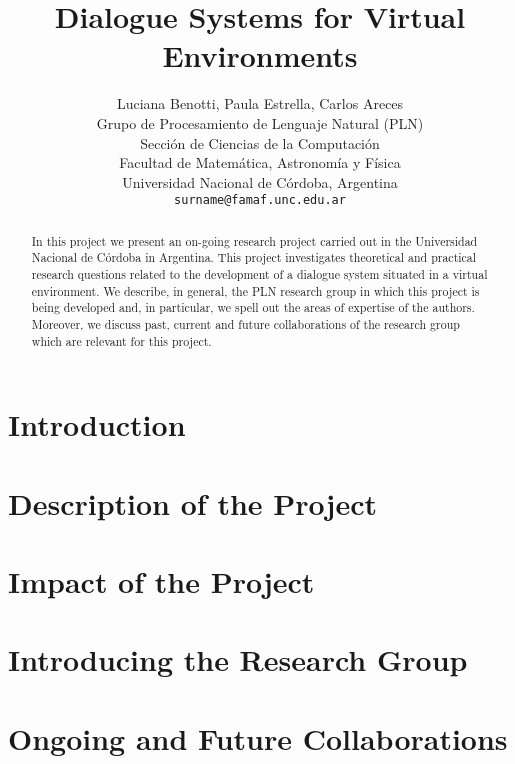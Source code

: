 \documentclass[11pt,letterpaper]{article}
\title{Dialogue Systems for Virtual Environments}
\author{Luciana Benotti, Paula Estrella, Carlos Areces \\
 Grupo de Procesamiento de Lenguaje Natural (PLN) \\
Secci\'on de Ciencias de la Computaci\'on \\
Facultad de Matem\'atica, Astronom\'ia y F\'isica \\
Universidad Nacional de C\'ordoba, Argentina \\
  {\tt surname@famaf.unc.edu.ar}
}
\date{}
\begin{document}
\maketitle
\begin{abstract}
In this project we present an on-going research project carried out in the Universidad Nacional de C\'ordoba in Argentina. This project investigates theoretical and practical research questions related to the development of a dialogue system situated in a virtual environment. We describe, in general, the PLN research group in which this project is being developed and, in particular, we spell out the areas of expertise of the authors. Moreover, we discuss past, current and future collaborations of the research group which are relevant for this project.
\end{abstract}

\section{Introduction}\label{intro}


\section{Description of the Project}\label{description}


\section{Impact of the Project}\label{impact}


\section{Introducing the Research Group}\label{group}


\section{Ongoing and Future Collaborations}\label{collaboration}




\end{document}
